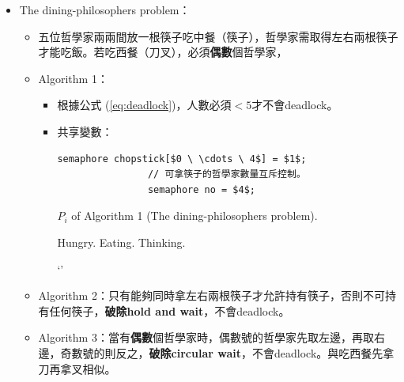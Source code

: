 \begin{itemize}
\begin{itemize}
\begin{algorithm}[H]
\begin{algorithmic}[1]
                        \EndIf
                \EndFunction
            \end{algorithmic}
        \end{algorithm}
    \end{itemize}
    \item The dining-philosophers problem：\begin{itemize}
        \item 五位哲學家兩兩間放一根筷子吃中餐（筷子），哲學家需取得左右兩根筷子才能吃飯。若吃西餐（刀叉），必須\textbf{偶數}個哲學家，
        \item Algorithm 1：\begin{itemize}
            \item 根據公式 (\ref{eq:deadlock})，人數必須$< 5$才不會deadlock。
            \item 共享變數：\begin{lstlisting}[caption={Shared variables of The dining-philosophers problem.}, captionpos=b, mathescape=true]
                semaphore chopstick[$0 \ \cdots \ 4$] = $1$;
                // 可拿筷子的哲學家數量互斥控制。
                semaphore no = $4$; 
            \end{lstlisting}
            \begin{algorithm}[H]
                \caption{$P_i$ of Algorithm 1 (The dining-philosophers problem).}
                \begin{algorithmic}[1]
                        \Repeat
                            \State {}
                            \State Hungry.
                            \State {}
                            \State {}
                            \State Eating.
                            \State {}
                            \State {}
                            \State Thinking.
                            \State {}
                    \EndFunction
                \end{algorithmic}`'
            \end{algorithm}
        \end{itemize}
        \item Algorithm 2：只有能夠同時拿左右兩根筷子才允許持有筷子，否則不可持有任何筷子，\textbf{破除hold and wait}，不會deadlock。
        \item Algorithm 3：當有\textbf{偶數}個哲學家時，偶數號的哲學家先取左邊，再取右邊，奇數號的則反之，\textbf{破除circular wait}，不會deadlock。與吃西餐先拿刀再拿叉相似。

\end{itemize}
\end{itemize}
